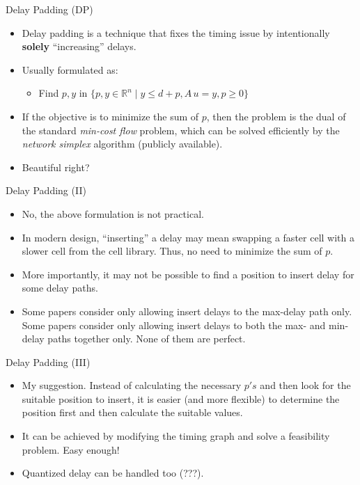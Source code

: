 \documentclass[10pt,ignorenonframetext,mathserif,onlymath]{beamer}
\providecommand{\tightlist}{%
  \setlength{\itemsep}{0pt}\setlength{\parskip}{0pt}}
\begin{document}
\begin{frame}{Delay Padding (DP)}
\protect\hypertarget{delay-padding-dp}{}

\begin{itemize}
\tightlist
\item
  Delay padding is a technique that fixes the timing issue by
  intentionally \textbf{solely} “increasing” delays.
\item
  Usually formulated as:

  \begin{itemize}
  \tightlist
  \item
    Find \(p, y\) in
    \(\{p, y \in \mathbb{R}^n \mid y \leq d + p, A\,u = y, p \geq 0\}\)
  \end{itemize}
\item
  If the objective is to minimize the sum of \(p\), then the problem is
  the dual of the standard \emph{min-cost flow} problem, which can be
  solved efficiently by the \emph{network simplex} algorithm (publicly
  available).
\item
  Beautiful right?
\end{itemize}

\end{frame}

\begin{frame}{Delay Padding (II)}
\protect\hypertarget{delay-padding-ii}{}

\begin{itemize}
\tightlist
\item
  No, the above formulation is not practical.
\item
  In modern design, “inserting” a delay may mean swapping a faster cell
  with a slower cell from the cell library. Thus, no need to minimize
  the sum of \(p\).
\item
  More importantly, it may not be possible to find a position to insert
  delay for some delay paths.
\item
  Some papers consider only allowing insert delays to the max-delay path
  only. Some papers consider only allowing insert delays to both the
  max- and min-delay paths together only. None of them are perfect.
\end{itemize}

\end{frame}

\begin{frame}{Delay Padding (III)}
\protect\hypertarget{delay-padding-iii}{}

\begin{itemize}
\tightlist
\item
  My suggestion. Instead of calculating the necessary \(p's\) and then
  look for the suitable position to insert, it is easier (and more
  flexible) to determine the position first and then calculate the
  suitable values.
\item
  It can be achieved by modifying the timing graph and solve a
  feasibility problem. Easy enough!
\item
  Quantized delay can be handled too (???).
\end{itemize}

\end{frame}
\end{document}
